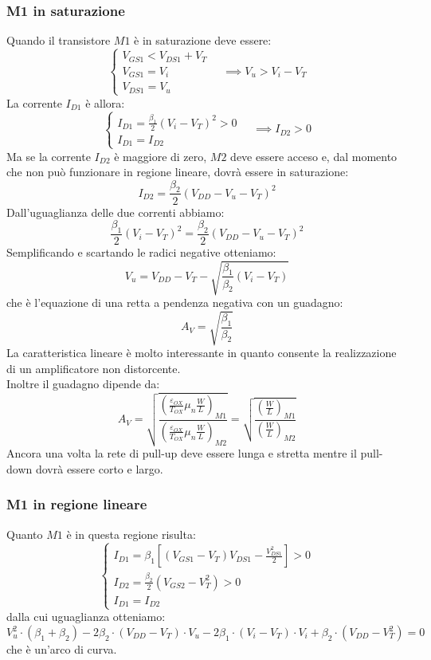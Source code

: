 \documentclass[../main.tex]{subfiles}
\begin{document}
	\subsubsection{M1 in saturazione}
	Quando il transistore $M1$ è in saturazione deve essere:
	$$\begin{cases} V_{GS1} < V_{DS1} + V_T \\ V_{GS1} = V_i \\ V_{DS1} = V_u \end{cases} \quad \implies V_u > V_i - V_T$$
	La corrente $I_{D1}$ è allora:
	$$\begin{cases} I_{D1} = \frac{\beta_1}{2} (V_i - V_T)^2 > 0 \\ I_{D1} = I_{D2} \end{cases} \quad \implies I_{D2} > 0$$
	Ma se la corrente $I_{D2}$ è maggiore di zero, $M2$ deve essere acceso e, dal momento che non può funzionare in regione lineare, dovrà essere in saturazione:
	$$I_{D2} = \frac{\beta_2}{2} (V_{DD} - V_u - V_T)^2$$
	Dall'uguaglianza delle due correnti abbiamo:
	$$\frac{\beta_1}{2} (V_i - V_T)^2 = \frac{\beta_2}{2} (V_{DD} - V_u - V_T)^2$$
	Semplificando e scartando le radici negative otteniamo:
	$$V_u = V_{DD} - V_T - \sqrt{\frac{\beta_1}{\beta_2} (V_i - V_T)}$$
	che è l'equazione di una retta a pendenza negativa con un guadagno:
	$$A_V = \sqrt{\frac{\beta_1}{\beta_2}}$$
	La caratteristica lineare è molto interessante in quanto consente la realizzazione di un amplificatore non distorcente.\\
	Inoltre il guadagno dipende da:
	$$A_V = \sqrt{\frac{\left(\frac{\varepsilon_{OX}}{T_{OX}} \mu_n \frac{W}{L}\right)_{M1}}{\left(\frac{\varepsilon_{OX}}{T_{OX}} \mu_n \frac{W}{L}\right)_{M2}}} = \sqrt{\frac{\left(\frac{W}{L}\right)_{M1}}{\left(\frac{W}{L}\right)_{M2}}}$$
	Ancora una volta la rete di pull-up deve essere lunga e stretta mentre il pull-down dovrà essere corto e largo.
	\subsubsection{M1 in regione lineare}
	Quanto $M1$ è in questa regione risulta:
	$$\begin{cases} I_{D1} = \beta_1 \left[ (V_{GS1} - V_T) V_{DS1} - \frac{V_{DS1}^2}{2} \right] > 0 \\ I_{D2} = \frac{\beta_2}{2} (V_{GS2} - V_T^2) > 0 \\ I_{D1} = I_{D2} \end{cases}$$
	dalla cui uguaglianza otteniamo:
	$$V_u^2 \cdot (\beta_1 + \beta_2) - 2\beta_2 \cdot (V_{DD} - V_T) \cdot V_u - 2\beta_1 \cdot (V_i - V_T) \cdot V_i + \beta_2 \cdot (V_{DD} - V_T^2) = 0$$
	che è un'arco di curva.
\end{document}
